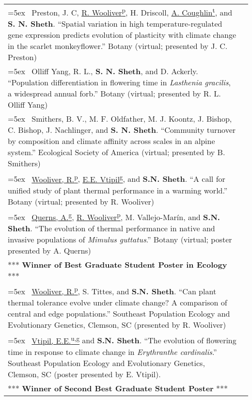 \documentclass[11pt,english]{article}\usepackage[]{graphicx}\usepackage[]{xcolor}
\providecommand{\tabularnewline}{\\}
\begin{document}
\renewcommand{\arraystretch}{1.2}
\begin{tabularx}{\textwidth}{@{}>{\raggedright}p{5.25in} >{\raggedleft}X@{}}

\hangindent=5ex \ Preston, J. C, \underline{R. Wooliver\textsuperscript{p}}, H. Driscoll, \underline{A. Coughlin\textsuperscript{t}}, and \textbf{S. N. Sheth}. ``Spatial variation in high temperature-regulated gene expression predicts evolution of plasticity with climate change in the scarlet monkeyflower.'' Botany (virtual; presented by J. C. Preston) & 2021 \tabularnewline

\hangindent=5ex \ Olliff Yang, R. L., \textbf{S. N. Sheth}, and D. Ackerly. ``Population differentiation in flowering time in \emph{Lasthenia gracilis}, a widespread annual forb.'' Botany (virtual; presented by R. L. Olliff Yang) & 2021 \tabularnewline

\hangindent=5ex \ Smithers, B. V., M. F. Oldfather, M. J. Koontz, J. Bishop, C. Bishop, J. Nachlinger, and \textbf{S. N. Sheth}. ``Community turnover by composition and climate affinity across scales in an alpine system.'' Ecological Society of America (virtual; presented by B. Smithers) & 2020 \tabularnewline

\hangindent=5ex \ \underline{Wooliver, R.\textsuperscript{p}}, \underline{E.E. Vtipil\textsuperscript{g}}, and \textbf{S.N. Sheth}. ``A call for unified study of plant thermal performance in a warming world.'' Botany (virtual; presented by R. Wooliver) & 2020 \tabularnewline

\hangindent=5ex \ \underline{Querns, A.\textsuperscript{g}}, \underline{R. Wooliver\textsuperscript{p}}, M. Vallejo-Mar\'in, and \textbf{S.N. Sheth}. ``The evolution of thermal performance in native and invasive populations of \emph{Mimulus guttatus}.'' Botany (virtual; poster presented by A. Querns) & 2020 \tabularnewline
\hspace{7mm} *** \textbf{Winner of Best Graduate Student Poster in Ecology} *** \tabularnewline

\hangindent=5ex \ \underline{Wooliver, R.\textsuperscript{p}}, S. Tittes, and \textbf{S.N. Sheth}. ``Can plant thermal tolerance evolve under climate change? A comparison of central and edge populations.'' Southeast Population Ecology and Evolutionary Genetics, Clemson, SC (presented by R. Wooliver) & 2019 \tabularnewline

\hangindent=5ex \ \underline{Vtipil, E.E.\textsuperscript{u,g}} and \textbf{S.N. Sheth}. ``The evolution of flowering time in response to climate change in \emph{Erythranthe cardinalis}.'' Southeast Population Ecology and Evolutionary Genetics, Clemson, SC (poster presented by E. Vtipil). & 2019 \tabularnewline
\hspace{7mm} *** \textbf{Winner of Second Best Graduate Student Poster} *** \tabularnewline


\end{tabularx}
\end{document}
